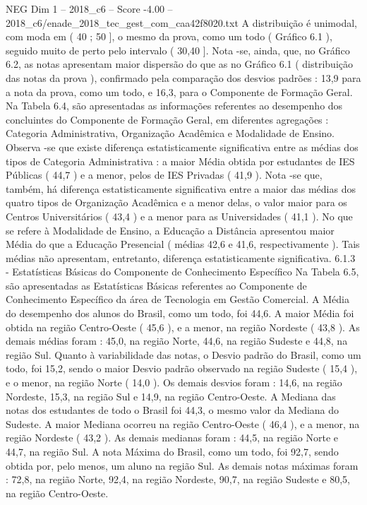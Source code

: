 \begin{textsample}{NEG Dim 1 – 2018\_c6 – Score -4.00 – 2018\_c6/enade\_2018\_tec\_gest\_com\_caa42f8020.txt}
A distribuição é unimodal, com moda em ( 40 ; 50 ], o mesmo da prova, como um todo ( Gráfico 6.1 ), seguido muito de perto pelo intervalo ( 30,40 ].
Nota -se, ainda, que, no Gráfico 6.2, as notas apresentam maior dispersão do que as no Gráfico 6.1 ( distribuição das notas da prova ), confirmado pela comparação dos desvios padrões : 13,9 para a nota da prova, como um todo, e 16,3, para o Componente de Formação Geral.
Na Tabela 6.4, são apresentadas as informações referentes ao desempenho dos concluintes do Componente de Formação Geral, em diferentes agregações : Categoria Administrativa, Organização Acadêmica e Modalidade de Ensino.
Observa -se que existe diferença estatisticamente significativa entre as médias dos tipos de Categoria Administrativa : a maior Média obtida por estudantes de IES Públicas ( 44,7 ) e a menor, pelos de IES Privadas ( 41,9 ).
Nota -se que, também, há diferença estatisticamente significativa entre a maior das médias dos quatro tipos de Organização Acadêmica e a menor delas, o valor maior para os Centros Universitários ( 43,4 ) e a menor para as Universidades ( 41,1 ).
No que se refere à Modalidade de Ensino, a Educação a Distância apresentou maior Média do que a Educação Presencial ( médias 42,6 e 41,6, respectivamente ).
Tais médias não apresentam, entretanto, diferença estatisticamente significativa. 6.1.3 - Estatísticas Básicas do Componente de Conhecimento Específico Na Tabela 6.5, são apresentadas as Estatísticas Básicas referentes ao Componente de Conhecimento Específico da área de Tecnologia em Gestão Comercial.
A Média do desempenho dos alunos do Brasil, como um todo, foi 44,6.
A maior Média foi obtida na região Centro-Oeste ( 45,6 ), e a menor, na região Nordeste ( 43,8 ).
As demais médias foram : 45,0, na região Norte, 44,6, na região Sudeste e 44,8, na região Sul.
Quanto à variabilidade das notas, o Desvio padrão do Brasil, como um todo, foi 15,2, sendo o maior Desvio padrão observado na região Sudeste ( 15,4 ), e o menor, na região Norte ( 14,0 ).
Os demais desvios foram : 14,6, na região Nordeste, 15,3, na região Sul e 14,9, na região Centro-Oeste.
A Mediana das notas dos estudantes de todo o Brasil foi 44,3, o mesmo valor da Mediana do Sudeste.
A maior Mediana ocorreu na região Centro-Oeste ( 46,4 ), e a menor, na região Nordeste ( 43,2 ).
As demais medianas foram : 44,5, na região Norte e 44,7, na região Sul.
A nota Máxima do Brasil, como um todo, foi 92,7, sendo obtida por, pelo menos, um aluno na região Sul.
As demais notas máximas foram : 72,8, na região Norte, 92,4, na região Nordeste, 90,7, na região Sudeste e 80,5, na região Centro-Oeste.

\end{textsample}
